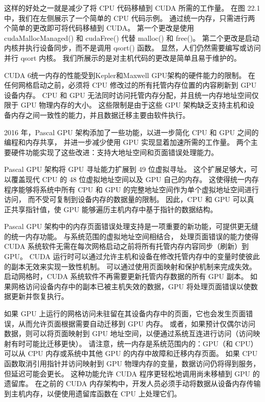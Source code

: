 这样的好处之一就是减少了将 CPU 代码移植到 CUDA 所需的工作量。 在图 22.1 中，我们在左侧展示了一个简单的 CPU 代码示例。 
通过统一内存，只需进行两个简单的更改即可将代码移植到 CUDA。 
第一个更改是使用 cudaMallocManaged() 和 cudaFree() 代替 malloc() 和 free()。 
第二个更改是启动内核并执行设备同步，而不是调用 qsort() 函数。 
显然，人们仍然需要编写或访问并行 qsort 内核。 我们所展示的是对主机代码的更改是简单且易于维护的。

CUDA 6统一内存的性能受到Kepler和Maxwell GPU架构的硬件能力的限制。 
在任何网格启动之前，必须将 CPU 修改过的所有托管内存位置的内容刷新到 GPU 设备内存。 
CPU 和 GPU 无法同时访问托管内存分配，并且统一内存地址空间仅限于 GPU 物理内存的大小。 
这些限制是由于这些 GPU 架构缺乏支持主机和设备内存之间一致性的能力，并且数据迁移主要由软件执行。

2016 年，Pascal GPU 架构添加了一些功能，以进一步简化 CPU 和 GPU 之间的编程和内存共享，
并进一步减少使用 GPU 实现显着加速所需的工作量。 两个主要硬件功能实现了这些改进：支持大地址空间和页面错误处理能力。

Pascal GPU 架构将 GPU 寻址能力扩展到 49 位虚拟寻址。 
这个扩展足够大，可以覆盖现代 CPU 的 48 位虚拟地址空间以及 GPU 自己的内存。 
这使得统一内存程序能够将系统中所有 CPU 和 GPU 的完整地址空间作为单个虚拟地址空间进行访问，
而不受可复制到设备内存的数据量的限制。 因此，CPU 和 GPU 可以真正共享指针值，使 GPU 能够遍历主机内存中基于指针的数据结构。

Pascal GPU 架构中的内存页面错误处理支持是一项重要的新功能，可提供更无缝的统一内存功能。 
与系统范围的虚拟地址空间相结合，
处理页面错误的能力使得 CUDA 系统软件无需在每次网格启动之前将所有托管内存内容同步（刷新）到 GPU。 
CUDA 运行时可以通过允许主机和设备在修改托管内存中的变量时使彼此的副本无效来实现一致性机制。 
可以通过使用页面映射和保护机制来完成失效。 启动网格时，CUDA 系统软件不再需要更新托管内存数据的所有 GPU 副本。 
如果网格访问设备内存中的副本已被主机失效的数据，GPU 将处理页面错误以使数据更新并恢复执行。

如果 GPU 上运行的网格访问未驻留在其设备内存中的页面，它也会发生页面错误，从而允许页面根据需要自动迁移到 GPU 内存。 
或者，如果预计仅偶尔访问数据，则可以将页面映射到 GPU 地址空间，以便通过系统互连进行访问（访问映射有时可能比迁移更快）。 
请注意，统一内存是系统范围内的：GPU（和 CPU）可以从 CPU 内存或系统中其他 GPU 的内存中故障和迁移内存页面。 
如果 CPU 函数取消引用指针并访问映射到 GPU 物理内存的变量，数据访问仍将得到服务，但延迟可能会更长。 
这种功能允许 CUDA 程序更轻松地调用尚未移植到 GPU 的遗留库。 
在之前的 CUDA 内存架构中，开发人员必须手动将数据从设备内存传输到主机内存，以便使用遗留库函数在 CPU 上处理它们。

